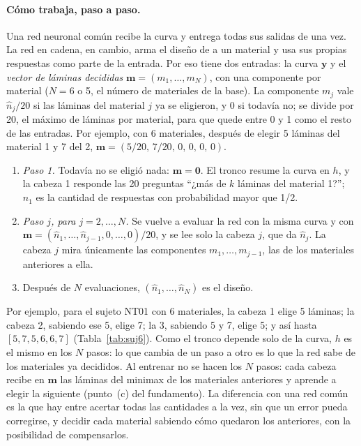 \paragraph{Cómo trabaja, paso a paso.} Una red neuronal común recibe la curva y entrega todas sus salidas de una vez. La red en cadena, en cambio, arma el diseño de a un material y usa sus propias respuestas como parte de la entrada. Por eso tiene dos entradas: la curva $\mathbf{y}$ y el \emph{vector de láminas decididas} $\mathbf{m}=(m_1,\ldots,m_N)$, con una componente por material ($N=6$ o 5, el número de materiales de la base). La componente $m_j$ vale $\hat n_j/20$ si las láminas del material $j$ ya se eligieron, y 0 si todavía no; se divide por 20, el máximo de láminas por material, para que quede entre 0 y 1 como el resto de las entradas. Por ejemplo, con 6 materiales, después de elegir 5 láminas del material 1 y 7 del 2, $\mathbf{m}=(5/20,\,7/20,\,0,\,0,\,0,\,0)$.
\begin{enumerate}[label=(\arabic*)]
\item \emph{Paso 1.} Todavía no se eligió nada: $\mathbf{m}=\mathbf{0}$. El tronco resume la curva en $h$, y la cabeza 1 responde las 20 preguntas ``¿más de $k$ láminas del material 1?''; $\hat n_1$ es la cantidad de respuestas con probabilidad mayor que 1/2.
\item \emph{Paso $j$, para $j=2,\ldots,N$.} Se vuelve a evaluar la red con la misma curva y con $\mathbf{m}=(\hat n_1,\ldots,\hat n_{j-1},0,\ldots,0)/20$, y se lee solo la cabeza $j$, que da $\hat n_j$. La cabeza $j$ mira únicamente las componentes $m_1,\ldots,m_{j-1}$, las de los materiales anteriores a ella.
\item Después de $N$ evaluaciones, $(\hat n_1,\ldots,\hat n_N)$ es el diseño.
\end{enumerate}
Por ejemplo, para el sujeto NT01 con 6 materiales, la cabeza 1 elige 5 láminas; la cabeza 2, sabiendo ese 5, elige 7; la 3, sabiendo 5 y 7, elige 5; y así hasta $[5,7,5,6,6,7]$ (Tabla~\ref{tab:suj6}). Como el tronco depende solo de la curva, $h$ es el mismo en los $N$ pasos: lo que cambia de un paso a otro es lo que la red sabe de los materiales ya decididos. Al entrenar no se hacen los $N$ pasos: cada cabeza recibe en $\mathbf{m}$ las láminas del minimax de los materiales anteriores y aprende a elegir la siguiente (punto~(c) del fundamento). La diferencia con una red común es la que hay entre acertar todas las cantidades a la vez, sin que un error pueda corregirse, y decidir cada material sabiendo cómo quedaron los anteriores, con la posibilidad de compensarlos.

